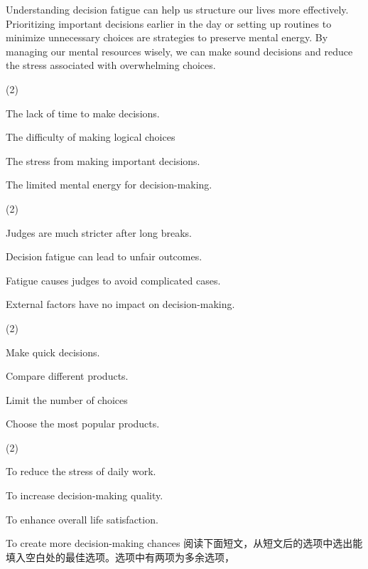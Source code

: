 \documentclass{英语试卷}
\begin{document}
\par Understanding decision fatigue can help us structure our lives more effectively. Prioritizing important decisions earlier in the day or setting up routines to minimize unnecessary choices are strategies to preserve mental energy. By managing our mental resources wisely, we can make sound decisions and reduce the stress associated with overwhelming choices.\par
{}
\begin{choices}(2)
  \item The lack of time to make decisions.
  \item The difficulty of making logical choices
  \item The stress from making important decisions.
  \item The limited mental energy for decision-making.
\end{choices}
\begin{choices}(2)
  \item Judges are much stricter after long breaks.
  \item Decision fatigue can lead to unfair outcomes.
  \item Fatigue causes judges to avoid complicated cases.
  \item External factors have no impact on decision-making.
\end{choices}
\begin{choices}(2)
  \item Make quick decisions.
  \item Compare different products.
  \item Limit the number of choices
  \item Choose the most popular products.
\end{choices}
\begin{choices}(2)
  \item To reduce the stress of daily work.
  \item To increase decision-making quality.
  \item To enhance overall life satisfaction.
  \item To create more decision-making chances 阅读下面短文，从短文后的选项中选出能填入空白处的最佳选项。选项中有两项为多余选项，
\end{choices}
\end{document}
